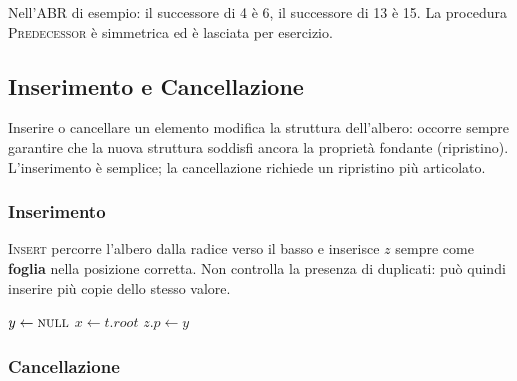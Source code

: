 \begin{nota}
	Nell'ABR di esempio: il successore di 4 è 6, il successore di 13 è 15.
	La procedura \textsc{Predecessor} è simmetrica ed è lasciata per esercizio.
\end{nota}

\subsection{Inserimento e Cancellazione}
\label{sub:abr_modifica}

Inserire o cancellare un elemento modifica la struttura dell'albero: occorre sempre
garantire che la nuova struttura soddisfi ancora la proprietà fondante (ripristino).
L'inserimento è semplice; la cancellazione richiede un ripristino più articolato.

\subsubsection{Inserimento}
\label{subsub:insert}

\begin{softnote}
	\textsc{Insert} percorre l'albero dalla radice verso il basso e inserisce $z$ sempre
	come \textbf{foglia} nella posizione corretta. Non controlla la presenza di duplicati:
	può quindi inserire più copie dello stesso valore.
\end{softnote}

\begin{algorithm}[H]
	\caption{\textsc{Insert}$(t,\, z)$}
	$y \leftarrow \textsc{null}$\;
	$x \leftarrow t.\mathit{root}$\;
	$z.p \leftarrow y$\;
\end{algorithm}

\subsubsection{Cancellazione}
\label{subsub:delete}

